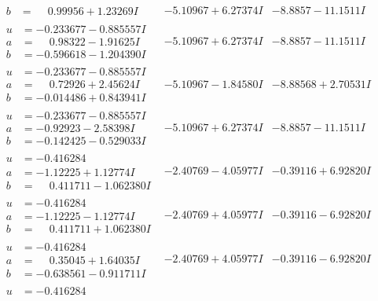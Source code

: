 \documentclass[1p]{elsarticle_modified}
\theoremstyle{definition}
\begin{document}
$$\begin{array}{c|c|c}
\begin{aligned}
b &= \phantom{-}0.99956 + 1.23269 I\end{aligned}
 & -5.10967 + 6.27374 I & -8.8857 - 11.1511 I \\ \hline\begin{aligned}
u &= -0.233677 - 0.885557 I \\
a &= \phantom{-}0.98322 - 1.91625 I \\
b &= -0.596618 - 1.204390 I\end{aligned}
 & -5.10967 + 6.27374 I & -8.8857 - 11.1511 I \\ \hline\begin{aligned}
u &= -0.233677 - 0.885557 I \\
a &= \phantom{-}0.72926 + 2.45624 I \\
b &= -0.014486 + 0.843941 I\end{aligned}
 & -5.10967 - 1.84580 I & -8.88568 + 2.70531 I \\ \hline\begin{aligned}
u &= -0.233677 - 0.885557 I \\
a &= -0.92923 - 2.58398 I \\
b &= -0.142425 - 0.529033 I\end{aligned}
 & -5.10967 + 6.27374 I & -8.8857 - 11.1511 I \\ \hline\begin{aligned}
u &= -0.416284\phantom{ +0.000000I} \\
a &= -1.12225 + 1.12774 I \\
b &= \phantom{-}0.411711 - 1.062380 I\end{aligned}
 & -2.40769 - 4.05977 I & -0.39116 + 6.92820 I \\ \hline\begin{aligned}
u &= -0.416284\phantom{ +0.000000I} \\
a &= -1.12225 - 1.12774 I \\
b &= \phantom{-}0.411711 + 1.062380 I\end{aligned}
 & -2.40769 + 4.05977 I & -0.39116 - 6.92820 I \\ \hline\begin{aligned}
u &= -0.416284\phantom{ +0.000000I} \\
a &= \phantom{-}0.35045 + 1.64035 I \\
b &= -0.638561 - 0.911711 I\end{aligned}
 & -2.40769 + 4.05977 I & -0.39116 - 6.92820 I \\ \hline\begin{aligned}
u &= -0.416284\phantom{ +0.000000I} \\

\end{aligned}
\end{array}$$
\end{document}
